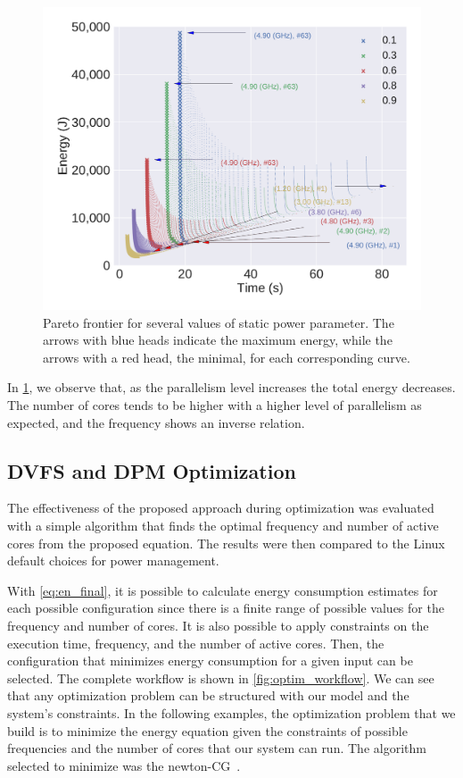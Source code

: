 \begin{figure}[H]
	\includegraphics[width=\columnwidth]{models/figures/analisys/pareto_w_high.pdf}
	\caption{Pareto frontier for several values of static power parameter. The arrows with blue heads indicate the maximum energy, while the arrows with a red head, the minimal, for each corresponding curve.}%
	\label{fig:pareto_w}
\end{figure}

In  \cref{fig:pareto_w}, we observe that, as the parallelism level increases the total energy decreases. The number of cores tends to be higher with a higher level of parallelism as expected, and the frequency shows an inverse relation.


\subsection{DVFS and DPM Optimization} \label{subsec:dvfs_optmin}
The effectiveness of the proposed approach during optimization was evaluated with a simple algorithm that finds the optimal frequency and number of active cores from the proposed equation. The results were then compared to the Linux default choices for power management.

With \cref{eq:en_final}, it is possible to calculate energy consumption estimates for each possible configuration since there is a finite range of possible values for the frequency and number of cores. It is also possible to apply constraints on the execution time, frequency, and the number of active cores. Then, the configuration that minimizes energy consumption for a given input can be selected. The complete workflow is shown in \cref{fig:optim_workflow}. We can see that any optimization problem can be structured with our model and the system's constraints. In the following examples, the optimization problem that we build is to minimize the energy equation given the constraints of possible frequencies and the number of cores that our system can run. The algorithm selected to minimize was the newton-CG~\cite{Royer2020AOptimization}.

